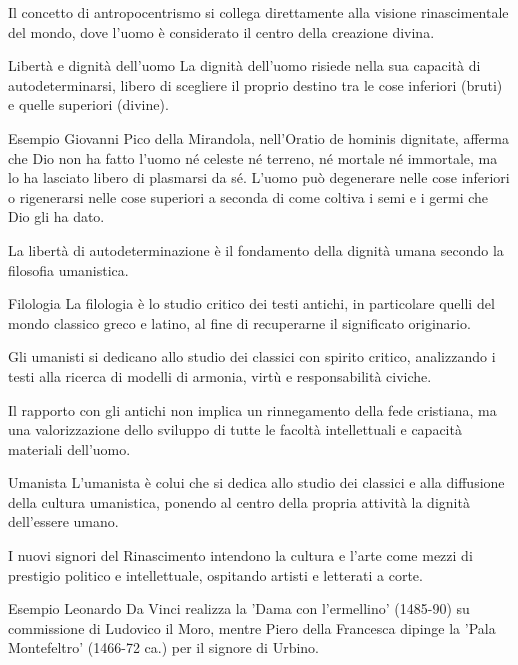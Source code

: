 \documentclass[12pt]{article}
\begin{document}
Il concetto di antropocentrismo si collega direttamente alla visione rinascimentale del mondo, dove l'uomo è considerato il centro della creazione divina.


\begin{defn}{Libertà e dignità dell'uomo}
La dignità dell'uomo risiede nella sua capacità di autodeterminarsi, libero di scegliere il proprio destino tra le cose inferiori (bruti) e quelle superiori (divine).
\end{defn}


\begin{ex}{Esempio}
Giovanni Pico della Mirandola, nell'Oratio de hominis dignitate, afferma che Dio non ha fatto l'uomo né celeste né terreno, né mortale né immortale, ma lo ha lasciato libero di plasmarsi da sé. L'uomo può degenerare nelle cose inferiori o rigenerarsi nelle cose superiori a seconda di come coltiva i semi e i germi che Dio gli ha dato.
\end{ex}


La libertà di autodeterminazione è il fondamento della dignità umana secondo la filosofia umanistica.


\begin{defn}{Filologia}
La filologia è lo studio critico dei testi antichi, in particolare quelli del mondo classico greco e latino, al fine di recuperarne il significato originario.
\end{defn}


Gli umanisti si dedicano allo studio dei classici con spirito critico, analizzando i testi alla ricerca di modelli di armonia, virtù e responsabilità civiche.


Il rapporto con gli antichi non implica un rinnegamento della fede cristiana, ma una valorizzazione dello sviluppo di tutte le facoltà intellettuali e capacità materiali dell'uomo.


\begin{defn}{Umanista}
L'umanista è colui che si dedica allo studio dei classici e alla diffusione della cultura umanistica, ponendo al centro della propria attività la dignità dell'essere umano.
\end{defn}


I nuovi signori del Rinascimento intendono la cultura e l'arte come mezzi di prestigio politico e intellettuale, ospitando artisti e letterati a corte.


\begin{ex}{Esempio}
Leonardo Da Vinci realizza la 'Dama con l'ermellino' (1485-90) su commissione di Ludovico il Moro, mentre Piero della Francesca dipinge la 'Pala Montefeltro' (1466-72 ca.) per il signore di Urbino.
\end{ex}
\end{document}
